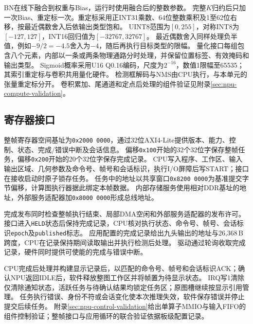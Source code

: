 BN在线下融合到权重与Bias，运行时使用融合后的整数参数。
完整$K$归约后只加一次Bias、重定标一次。重定标采用正INT31乘数、64位整数乘积及1至62位右移，按最近偶数舍入后依输出类型饱和。
UINT8范围为$[0,255]$，对称INT8为$[-127,127]$，INT16回归值为$[-32767,32767]$。
最近偶数舍入同样处理负半值，例如$-9/2=-4.5$舍入为$-4$，随后再执行目标类型的限幅。
量化接口每组包含八个元素，内部以一条或两条物理通路分时处理，并保留位置标签、有效掩码和输出类型。
Sigmoid概率采用U16 Q0.16编码，尺度为$2^{-16}$，数值1限幅至65535；其索引重定标与卷积共用量化硬件。
检测框解码与NMS由CPU执行，与本单元的张量重定标分开。
卷积累加、尾通道和定点后处理的组件验证见附录\ref{sec:npu-compute-validation}。

\subsection{寄存器接口}

整帧寄存器空间基址为\texttt{0x2000\,0000}，通过32位AXI4-Lite提供版本、能力、控制、状态、完成/错误中断及会话信息。
偏移\texttt{0x100}开始的32个32位字保存整帧任务，偏移\texttt{0x200}开始的20个32位字保存完成记录。
CPU写入程序、工作区、输入输出区域、几何参数及命令号、帧号和会话标识，执行I/O屏障后写START；接口在接收启动时原子锁存任务。
任务中的地址以共享窗口\texttt{0x8200\,0000}为基准提交字节偏移，计算图执行器据此绑定本帧数据。
内部存储服务使用相对DDR基址的地址，外部服务适配器加\texttt{0x8000\,0000}形成总线地址。

完成发布同时检查整帧执行结束、局部DMA空闲和外部服务适配器的发布许可。
接口进入\texttt{HELD}状态后保持完成记录，CPU核对执行状态、命令号、帧号、会话标识\texttt{epoch}及\texttt{published}标志。
应用配置的完成记录给出九头输出的地址与26,368\,B跨度，CPU在记录保持期间读取输出并执行检测后处理。
驱动通过轮询收取完成记录，硬件同时提供可使能的完成与错误中断。

CPU完成后处理并构建显示记录后，以匹配的命令号、帧号和会话标识ACK；确认NPU返回IDLE后，软件释放整图工作区并将帧置为待显示状态。
IRQ写1清除仅清除通知状态，活跃任务与待确认结果均锁定任务区；原图槽继续按显示引用管理。
任务执行错误、身份不符或会话变化使本次推理失效，软件保存错误并停止提交后续任务。
附录\ref{sec:npu-control-validation}给出单算子MMIO与输入FIFO的组件控制验证；整帧接口与应用循环的联合验证依据板级配置记录。

